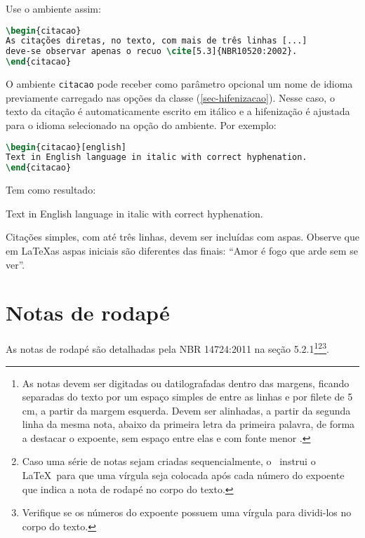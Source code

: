 \showfont
Use o ambiente assim:

\begin{lstlisting}[language=tex]
\begin{citacao}
As citações diretas, no texto, com mais de três linhas [...]
deve-se observar apenas o recuo \cite[5.3]{NBR10520:2002}.
\end{citacao}
\end{lstlisting}

\showfont

O ambiente \texttt{citacao} pode receber como parâmetro opcional um nome de
idioma previamente carregado nas opções da classe (\autoref{sec-hifenizacao}). Nesse
caso, o texto da citação é automaticamente escrito em itálico e a hifenização é
ajustada para o idioma selecionado na opção do ambiente. Por exemplo:

\begin{lstlisting}[language=tex]
\begin{citacao}[english]
Text in English language in italic with correct hyphenation.
\end{citacao}
\end{lstlisting}

Tem como resultado:

\begin{citacao}[english]
Text in English language in italic with correct hyphenation.
\end{citacao}

Citações simples, com até três linhas, devem ser
incluídas com aspas. Observe que em \LaTeX as aspas iniciais são diferentes das
finais: ``Amor é fogo que arde sem se ver''.

\section{Notas de rodapé}

As notas de rodapé são detalhadas pela NBR 14724:2011 na seção 5.2.1\footnote{As
notas devem ser digitadas ou datilografadas dentro das margens, ficando
separadas do texto por um espaço simples de entre as linhas e por filete de 5
cm, a partir da margem esquerda. Devem ser alinhadas, a partir da segunda linha
da mesma nota, abaixo da primeira letra da primeira palavra, de forma a destacar
o expoente, sem espaço entre elas e com fonte menor
.}\footnote{Caso uma série de notas sejam
criadas sequencialmente, o \abnTeX\ instrui o \LaTeX\ para que uma vírgula seja
colocada após cada número do expoente que indica a nota de rodapé no corpo do
texto.}\footnote{Verifique se os números do expoente possuem uma vírgula para
dividi-los no corpo do texto.}.


